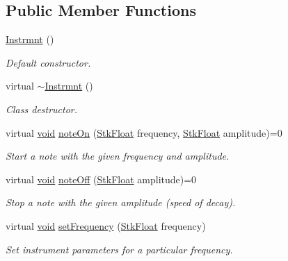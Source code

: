 \subsection*{Public Member Functions}
\begin{DoxyCompactItemize}
\item 
\hyperlink{class_nyq_1_1_instrmnt_ae51c552f09f0b24ebf314135e1b20af8}{Instrmnt} ()
\begin{DoxyCompactList}\small\item\em Default constructor. \end{DoxyCompactList}\item 
virtual \hyperlink{class_nyq_1_1_instrmnt_a44eee031e24dc71cbd0d01e295477a2a}{$\sim$\+Instrmnt} ()
\begin{DoxyCompactList}\small\item\em Class destructor. \end{DoxyCompactList}\item 
virtual \hyperlink{sound_8c_ae35f5844602719cf66324f4de2a658b3}{void} \hyperlink{class_nyq_1_1_instrmnt_a6e4522cf27022d191d7d2c66fa51b2c5}{note\+On} (\hyperlink{namespace_nyq_a044fa20a706520a617bbbf458a7db7e4}{Stk\+Float} frequency, \hyperlink{namespace_nyq_a044fa20a706520a617bbbf458a7db7e4}{Stk\+Float} amplitude)=0
\begin{DoxyCompactList}\small\item\em Start a note with the given frequency and amplitude. \end{DoxyCompactList}\item 
virtual \hyperlink{sound_8c_ae35f5844602719cf66324f4de2a658b3}{void} \hyperlink{class_nyq_1_1_instrmnt_a5190f029653fd24b138df6a71cab3ed4}{note\+Off} (\hyperlink{namespace_nyq_a044fa20a706520a617bbbf458a7db7e4}{Stk\+Float} amplitude)=0
\begin{DoxyCompactList}\small\item\em Stop a note with the given amplitude (speed of decay). \end{DoxyCompactList}\item 
virtual \hyperlink{sound_8c_ae35f5844602719cf66324f4de2a658b3}{void} \hyperlink{class_nyq_1_1_instrmnt_adf75819c0dc509c66fd850a39c052a21}{set\+Frequency} (\hyperlink{namespace_nyq_a044fa20a706520a617bbbf458a7db7e4}{Stk\+Float} frequency)
\begin{DoxyCompactList}\small\item\em Set instrument parameters for a particular frequency. \end{DoxyCompactList}\item 

\end{DoxyCompactItemize}
